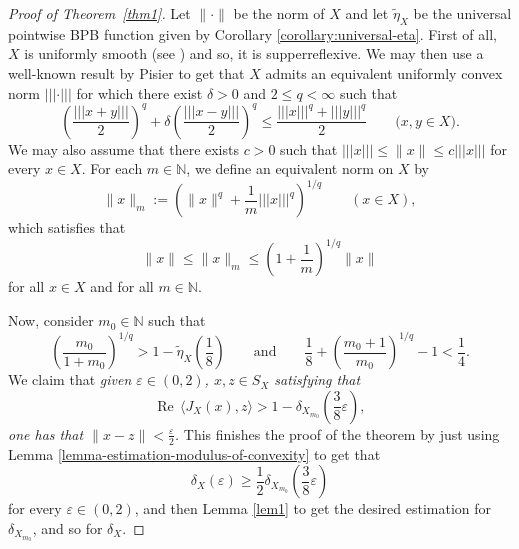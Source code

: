 \documentclass[a4paper,10pt]{amsart}
\theoremstyle{plain}
\theoremstyle{definition}
\DeclareMathOperator{\re}{Re\,}
\newcommand{\N}{\mathbb{N}}
\newcommand{\ds}{\displaystyle}
\newcommand{\eps}{\varepsilon}
\renewcommand{\geq}{\geqslant}
\renewcommand{\leq}{\leqslant}
\begin{document}
\begin{proof}[Proof of Theorem~\ref{thm1}]
Let $\|\cdot\|$ be the norm of $X$ and let $\tilde\eta_X$ be the universal pointwise BPB function given by Corollary \ref{corollary:universal-eta}. First of all, $X$ is uniformly smooth (see \cite[Proposition 2.1]{DKL}) and so, it is supperreflexive. We may then use a well-known result by Pisier \cite{Pi} to get that $X$ admits an equivalent uniformly convex norm $||| \cdot |||$ for which there exist $\delta > 0$ and $2 \leq q < \infty$ such that
\begin{equation}\label{equation:BPB-domain-Pisier}
\left( \frac{|||x + y|||}{2} \right)^q + \delta \left( \frac{|||x-y|||}{2}\right)^q \leq \frac{|||x|||^q+|||y|||^q}{2} \qquad \bigl(x,y \in X\bigr).
\end{equation}
We may also assume that there exists $c>0$ such that $|||x||| \leq \|x\| \leq c |||x|||$ for every $x \in X$. For each $m \in \N$, we define an equivalent norm on $X$ by
\begin{equation*}
\|x\|_m := \left(\|x\|^q + \frac{1}{m}|||x|||^q \right)^{1/q} \qquad (x \in X),	
\end{equation*}
which satisfies that
\begin{equation} \label{eq4}
\|x\| \leq \|x\|_m \leq \left(1 + \frac{1}{m} \right)^{1/q}\|x\|
\end{equation}	
for all $x \in X$ and for all $m \in \N$.

Now, consider $m_0\in \N$ such that
\begin{equation*}
\left(\frac{m_0}{1 + m_0}\right)^{1/q} > 1 - \tilde\eta_X\left( \frac{1}{8}\right) \qquad \text{and} \qquad  \frac{1}{8} +  \left(\frac{m_0+1}{m_0}\right)^{1/q} - 1 < \frac{1}{4}.	
\end{equation*}
We claim that \emph{given $\eps \in (0, 2)$, $x, z \in S_X$ satisfying that
\begin{equation*}
\re \langle J_X(x), z \rangle > 1 - \delta_{X_{m_0}} \left(\frac{3}{8} \eps \right),	
\end{equation*}
one has that $\ds \|x - z\| < \frac{\eps}{2}$.} This finishes the proof of the theorem by just using Lemma \ref{lemma-estimation-modulus-of-convexity} to get that
$$
\delta_{X} (\eps) \geq \frac{1}{2} \delta_{X_{m_0}}\left(\frac{3}{8}\eps \right)
$$
for every $\eps\in (0,2)$, and then Lemma \ref{lem1} to get the desired estimation for $\delta_{X_{m_0}}$, and so for $\delta_X$.


\end{proof}
\end{document}
